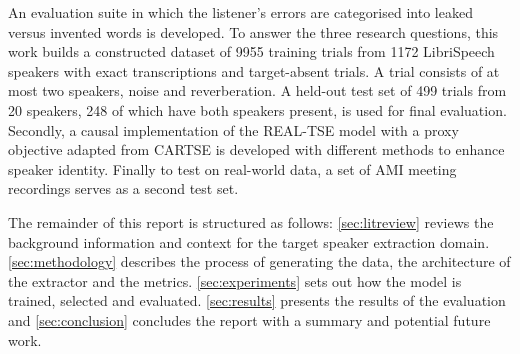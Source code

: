  An evaluation suite in which the listener's errors are categorised into leaked versus invented words is developed. To answer the three research questions, this work builds a constructed dataset of \num{9955} training trials from \num{1172} LibriSpeech \cite{panayotov2015librispeech} speakers with exact transcriptions and target-absent trials. A trial consists of at most two speakers, noise and reverberation. A held-out test set of \num{499} trials from \num{20} speakers, \num{248} of which have both speakers present, is used for final evaluation. Secondly, a causal implementation of the REAL-TSE model \cite{wang2026realtse} with a proxy objective adapted from CARTSE \cite{li2026cartse} is developed with different methods to enhance speaker identity. Finally to test on real-world data, a set of AMI meeting recordings \cite{carletta2005ami} serves as a second test set.

The remainder of this report is structured as follows: \autoref{sec:litreview} reviews the background information and context for the target speaker extraction domain. \autoref{sec:methodology} describes the process of generating the data, the architecture of the extractor and the metrics. \autoref{sec:experiments} sets out how the model is trained, selected and evaluated. \autoref{sec:results} presents the results of the evaluation and \autoref{sec:conclusion} concludes the report with a summary and potential future work.